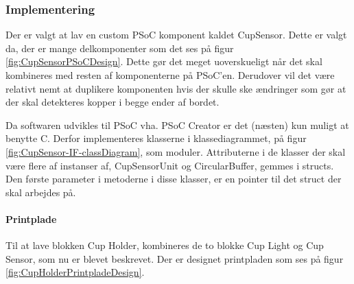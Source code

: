\documentclass[Rapport/Rapport_main.tex]{subfiles}
\begin{document}
 

\subsubsection{Implementering}\label{sec:CupSensorImplementering}
Der er valgt at lav en custom PSoC komponent kaldet CupSensor. Dette er valgt da, der er mange delkomponenter som det ses på figur \ref{fig:CupSensorPSoCDesign}. Dette gør det meget uoverskueligt når det skal kombineres med resten af komponenterne på PSoC'en. Derudover vil det være relativt nemt at duplikere komponenten hvis der skulle ske ændringer som gør at der skal detekteres kopper i begge ender af bordet.

Da softwaren udvikles til PSoC vha. PSoC Creator er det (næsten) kun muligt at benytte C. Derfor implementeres klasserne i klassediagrammet, på figur \ref{fig:CupSensor-IF-classDiagram}, som moduler. Attributerne i de klasser der skal være flere af instanser af, CupSensorUnit og CircularBuffer, gemmes i structs. Den første parameter i metoderne i disse klasser, er en pointer til det struct der skal arbejdes på.


\paragraph{Printplade} Til at lave blokken Cup Holder, kombineres de to blokke Cup Light og Cup Sensor, som nu er blevet beskrevet. Der er designet printpladen som ses på figur \ref{fig:CupHolderPrintpladeDesign}. 
\end{document}
